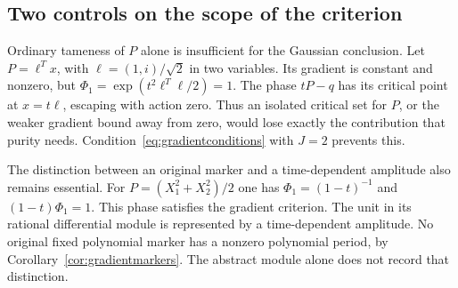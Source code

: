 \subsection{Two controls on the scope of the criterion}

Ordinary tameness of $P$ alone is insufficient for the Gaussian
conclusion. Let $P=\ell^Tx$, with $\ell=(1,i)/\sqrt2$ in two
variables. Its gradient is constant and nonzero, but
$\Phi_1=\exp(t^2\ell^T\ell/2)=1$. The phase $tP-q$ has its
critical point at $x=t\ell$, escaping with action zero. Thus an
isolated critical set for $P$, or the weaker gradient bound away
from zero, would lose exactly the contribution that purity needs.
Condition~\eqref{eq:gradientconditions} with $J=2$ prevents this.

The distinction between an original marker and a time-dependent
amplitude also remains essential. For
$P=(X_1^2+X_2^2)/2$ one has $\Phi_1=(1-t)^{-1}$ and
$(1-t)\Phi_1=1$. This phase satisfies the gradient criterion.
The unit in its rational differential module is represented by a
time-dependent amplitude. No original fixed polynomial marker has
a nonzero polynomial period, by Corollary~\ref{cor:gradientmarkers}.
The abstract module alone does not record that distinction.
